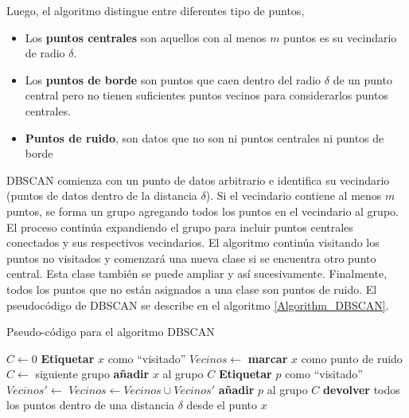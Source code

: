	Luego, el algoritmo distingue entre diferentes tipo de puntos,
	
	\begin{itemize}
		\item Los \textbf{puntos centrales} son aquellos con al menos $m$ puntos es su vecindario de radio $\delta$.
		\item Los \textbf{puntos de borde} son puntos que caen dentro del radio $\delta$ de un punto central pero no tienen suficientes puntos vecinos para considerarlos puntos centrales.
		\item \textbf{Puntos de ruido}, son datos que no son ni puntos centrales ni puntos de borde
	\end{itemize}


DBSCAN comienza con un punto de datos arbitrario e identifica su vecindario (puntos de datos dentro de la distancia $\delta$). Si el vecindario contiene al menos $m$ puntos, se forma un grupo agregando todos los puntos en el vecindario al grupo. El proceso continúa expandiendo el grupo para incluir puntos centrales conectados y sus respectivos vecindarios. El algoritmo continúa visitando los puntos no visitados y comenzará una nueva clase si se encuentra otro punto central. Esta clase también se puede ampliar y así sucesivamente. Finalmente, todos los puntos que no están asignados a una clase son puntos de ruido. El pseudocódigo de DBSCAN se describe en el algoritmo \eqref{Algorithm_DBSCAN}.

\begin{algorithm}
	\caption{Pseudo-código para el algoritmo DBSCAN \cite{ester1996}}
	\begin{algorithmic}[1]
			\State $C \gets 0$ 
				\State \textbf{Etiquetar} $x$ como ``visitado''	
				\State $Vecinos\gets$ 
					\State \textbf{marcar} $x$ como punto de ruido
				\Else
					\State $C\gets$ siguiente grupo
					\State {}
				\EndIf
			\EndFor
		\EndFunction
			\State \textbf{añadir} $x$ al grupo $C$
					\State \textbf{Etiquetar} $p$ como ``visitado''
					\State $Vecinos' \gets$
						\State $Vecinos \gets Vecinos \cup Vecinos'$
					\EndIf
				\EndIf
					\State \textbf{añadir} $p$ al grupo $C$
				\EndIf
			\EndFor
		\EndFunction
				\State \textbf{devolver} todos los puntos dentro de una distancia $\delta$ desde el punto $x$
		\EndFunction
	\end{algorithmic}
	\label{Algorithm_DBSCAN}
\end{algorithm} 


 
 